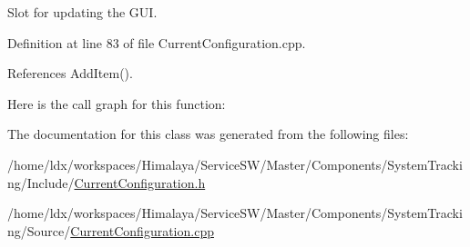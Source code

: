 \-Slot for updating the \-G\-U\-I. 



\-Definition at line 83 of file \-Current\-Configuration.\-cpp.



\-References \-Add\-Item().



\-Here is the call graph for this function\-:




\-The documentation for this class was generated from the following files\-:\begin{DoxyCompactItemize}
\item 
/home/ldx/workspaces/\-Himalaya/\-Service\-S\-W/\-Master/\-Components/\-System\-Tracking/\-Include/\hyperlink{CurrentConfiguration_8h}{\-Current\-Configuration.\-h}\item 
/home/ldx/workspaces/\-Himalaya/\-Service\-S\-W/\-Master/\-Components/\-System\-Tracking/\-Source/\hyperlink{CurrentConfiguration_8cpp}{\-Current\-Configuration.\-cpp}\end{DoxyCompactItemize}

